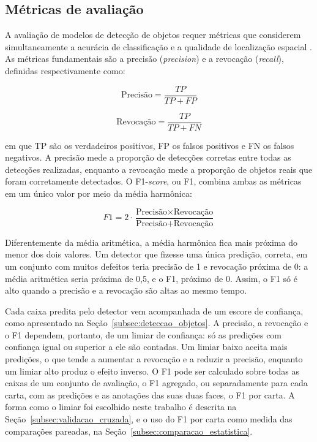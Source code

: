 \documentclass[
    12pt,                %
    openright,           %
    oneside,             %
    a4paper,             %
    english,             %
    brazil               %
]{abntex2}
\begin{document}
\subsection{Métricas de avaliação}
\label{subsec:metricas}

A avaliação de modelos de detecção de objetos requer métricas
que considerem simultaneamente a acurácia de classificação
e a qualidade de localização espacial \cite{Ramos2025}.
As métricas fundamentais são a precisão (\textit{precision})
e a revocação (\textit{recall}), definidas respectivamente
como:

\begin{equation}
    \text{Precisão} = \frac{TP}{TP + FP}
\end{equation}

\begin{equation}
    \text{Revocação} = \frac{TP}{TP + FN}
\end{equation}

em que TP são os verdadeiros positivos, FP os falsos positivos
e FN os falsos negativos. A precisão mede
a proporção de detecções corretas entre todas as detecções
realizadas, enquanto a revocação mede a proporção de objetos
reais que foram corretamente detectados. O F1-\textit{score}, ou F1,
combina ambas as métricas em um único valor por meio da
média harmônica:

\begin{equation}
    F1 = 2 \cdot \frac{\text{Precisão} \times \text{Revocação}}
    {\text{Precisão} + \text{Revocação}}
\end{equation}

Diferentemente da média aritmética, a média harmônica fica mais próxima
do menor dos dois valores. Um detector que fizesse uma única predição,
correta, em um conjunto com muitos defeitos teria precisão de 1 e
revocação próxima de 0: a média aritmética seria próxima de 0,5, e o
F1, próximo de 0. Assim, o F1 só é alto quando a precisão e a revocação
são altas ao mesmo tempo.

Cada caixa predita pelo detector vem acompanhada de um escore de
confiança, como apresentado na Seção~\ref{subsec:deteccao_objetos}.
A precisão, a revocação e o F1 dependem, portanto, de um limiar de
confiança: só as predições com confiança igual ou superior a ele são
contadas. Um limiar baixo aceita mais predições, o que tende a
aumentar a revocação e a reduzir a precisão, enquanto um limiar alto produz o
efeito inverso. O F1 pode ser calculado sobre todas as caixas de um
conjunto de avaliação, o F1 agregado, ou separadamente para cada
carta, com as predições e as anotações das suas duas faces, o F1 por
carta. A forma como o limiar foi escolhido neste trabalho é descrita
na Seção~\ref{subsec:validacao_cruzada}, e o uso do F1 por carta como
medida das comparações pareadas, na
Seção~\ref{subsec:comparacao_estatistica}.
\end{document}
